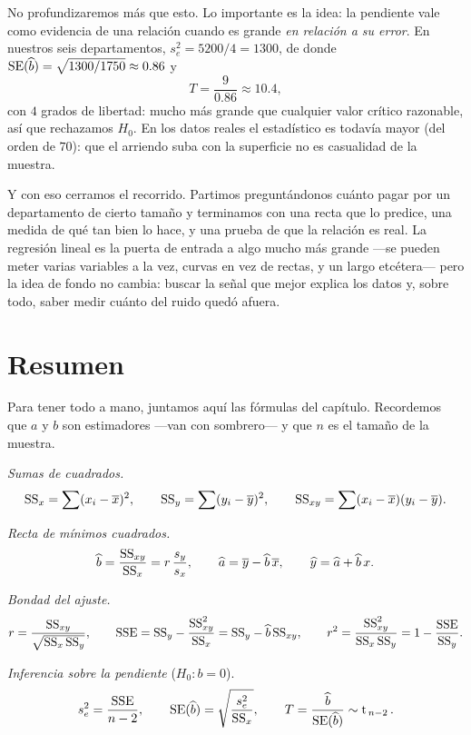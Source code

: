 No profundizaremos más que esto. Lo importante es la idea: la pendiente vale como evidencia de una relación cuando es grande \emph{en relación a su error}. En nuestros seis departamentos, \(s_e^2=\num{5200}/4=\num{1300}\), de donde \(\operatorname{SE}(\widehat{b})=\sqrt{\num{1300}/\num{1750}}\approx\num{0,86}\) y
\[T = \frac{9}{\num{0,86}} \approx \num{10,4},\]
con \(4\) grados de libertad: mucho más grande que cualquier valor crítico razonable, así que rechazamos \(H_0\). En los datos reales el estadístico es todavía mayor (del orden de \(70\)): que el arriendo suba con la superficie no es casualidad de la muestra.

Y con eso cerramos el recorrido. Partimos preguntándonos cuánto pagar por un departamento de cierto tamaño y terminamos con una recta que lo predice, una medida de qué tan bien lo hace, y una prueba de que la relación es real. La regresión lineal es la puerta de entrada a algo mucho más grande —se pueden meter varias variables a la vez, curvas en vez de rectas, y un largo etcétera— pero la idea de fondo no cambia: buscar la señal que mejor explica los datos y, sobre todo, saber medir cuánto del ruido quedó afuera.

\section{Resumen}

Para tener todo a mano, juntamos aquí las fórmulas del capítulo. Recordemos que \(a\) y \(b\) son estimadores —van con sombrero— y que \(n\) es el tamaño de la muestra.

\formal
\emph{Sumas de cuadrados.}
\[\mathrm{SS}_{x} = \sum (x_i-\overline{x})^2, \qquad \mathrm{SS}_{y} = \sum (y_i-\overline{y})^2, \qquad \mathrm{SS}_{xy} = \sum (x_i-\overline{x})(y_i-\overline{y}).\]

\emph{Recta de mínimos cuadrados.}
\[\widehat{b} = \frac{\mathrm{SS}_{xy}}{\mathrm{SS}_{x}} = r\,\frac{s_y}{s_x}, \qquad \widehat{a} = \overline{y} - \widehat{b}\,\overline{x}, \qquad \widehat{y} = \widehat{a} + \widehat{b}\,x.\]

\emph{Bondad del ajuste.}
\[r = \frac{\mathrm{SS}_{xy}}{\sqrt{\mathrm{SS}_{x}\,\mathrm{SS}_{y}}}, \qquad \mathrm{SSE} = \mathrm{SS}_{y} - \frac{\mathrm{SS}_{xy}^2}{\mathrm{SS}_{x}} = \mathrm{SS}_{y} - \widehat{b}\,\mathrm{SS}_{xy}, \qquad r^2 = \frac{\mathrm{SS}_{xy}^2}{\mathrm{SS}_{x}\,\mathrm{SS}_{y}} = 1 - \frac{\mathrm{SSE}}{\mathrm{SS}_{y}}.\]

\emph{Inferencia sobre la pendiente} (\(H_0: b=0\)).
\[s_e^2 = \frac{\mathrm{SSE}}{n-2}, \qquad \operatorname{SE}(\widehat{b}) = \sqrt{\frac{s_e^2}{\mathrm{SS}_{x}}}, \qquad T = \frac{\widehat{b}}{\operatorname{SE}(\widehat{b})} \sim \operatorname{t}_{\,n-2}.\]
\informal
